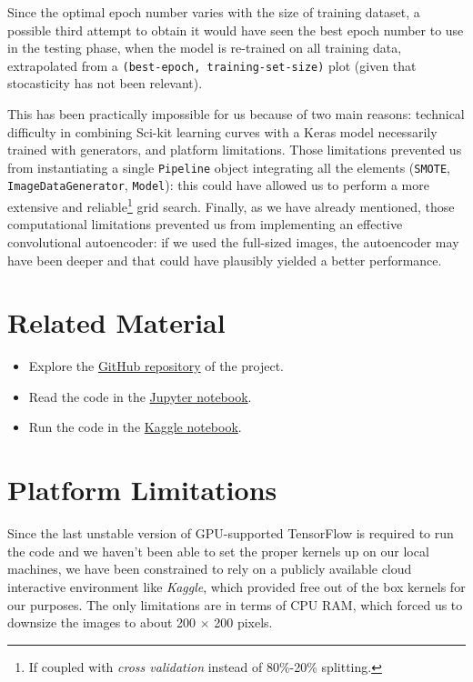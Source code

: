 \documentclass[aps,twocolumn,secnumarabic,nobalancelastpage,amsmath,amssymb,
nofootinbib]{revtex4}
\begin{document}
Since the optimal epoch number varies with the size of training dataset,
a possible third attempt to obtain it would have seen the best epoch
number to use in the testing phase, when the model is re-trained on all
training data, extrapolated from a
\texttt{(best-epoch,\ training-set-size)} plot (given that stocasticity
has not been relevant).

This has been practically impossible for us because of two main reasons:
technical difficulty in combining Sci-kit learning curves with a Keras
model necessarily trained with generators, and platform limitations. Those limitations prevented us from instantiating a single \texttt{Pipeline} object integrating all the elements (\texttt{SMOTE},
\texttt{ImageDataGenerator}, \texttt{Model}): this could have allowed us
to perform a more extensive and reliable\footnote{If coupled with
\emph{cross validation} instead of 80\%-20\% splitting.} grid search.
Finally, as we have already mentioned, those computational limitations
prevented us from implementing an effective convolutional autoencoder:
if we used the full-sized images, the autoencoder may have been deeper
and that could have plausibly yielded a better performance.


\appendix


\section{Related Material}\label{additional-material}

\begin{itemize}

\item
Explore the
\href{https://github.com/InPhyT/NeuralNetworksProject}{GitHub
	repository} of the project.
\vspace{-0.2cm}\item
Read the code in the
\href{https://nbviewer.jupyter.org/github/InPhyT/NeuralNetworksProject/notebook.ipynb}{Jupyter
	notebook}.
\vspace{-0.2cm}\item
Run the code in the
\href{https://www.kaggle.com/inphyt2020/neuralnetworksproject}{Kaggle
	notebook}.
\end{itemize}

\section{Platform Limitations}\label{platform-limitations}

Since the last unstable version of GPU-supported TensorFlow is required
to run the code and we haven't been able to set the proper kernels up on
our local machines, we have been constrained to rely on a publicly
available cloud interactive environment like \emph{Kaggle}, which
provided free out of the box kernels for our purposes. The only
limitations are in terms of CPU RAM, which forced us to downsize the
images to about 200 \(\times\) 200 pixels.
\end{document}
